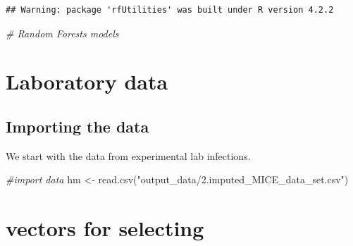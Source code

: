\documentclass[
]{article}
\newenvironment{Shaded}{\begin{snugshade}}{\end{snugshade}}
\newcommand{\CommentTok}[1]{\textcolor[rgb]{0.56,0.35,0.01}{\textit{#1}}}
\newcommand{\FunctionTok}[1]{\textcolor[rgb]{0.00,0.00,0.00}{#1}}
\newcommand{\NormalTok}[1]{#1}
\newcommand{\OtherTok}[1]{\textcolor[rgb]{0.56,0.35,0.01}{#1}}
\newcommand{\StringTok}[1]{\textcolor[rgb]{0.31,0.60,0.02}{#1}}
\begin{document}
\begin{verbatim}
## Warning: package 'rfUtilities' was built under R version 4.2.2
\end{verbatim}

\begin{Shaded}
\begin{Highlighting}[]
\CommentTok{\# Random Forests models}
\end{Highlighting}
\end{Shaded}

\hypertarget{laboratory-data}{%
\section{Laboratory data}\label{laboratory-data}}

\hypertarget{importing-the-data}{%
\subsection{Importing the data}\label{importing-the-data}}

We start with the data from experimental lab infections.

\begin{Shaded}
\begin{Highlighting}[]
\CommentTok{\#import data}
\NormalTok{hm }\OtherTok{\textless{}{-}} \FunctionTok{read.csv}\NormalTok{(}\StringTok{"output\_data/2.imputed\_MICE\_data\_set.csv"}\NormalTok{)}
\end{Highlighting}
\end{Shaded}

\hypertarget{vectors-for-selecting}{%
\section{vectors for selecting}\label{vectors-for-selecting}}
\end{document}
